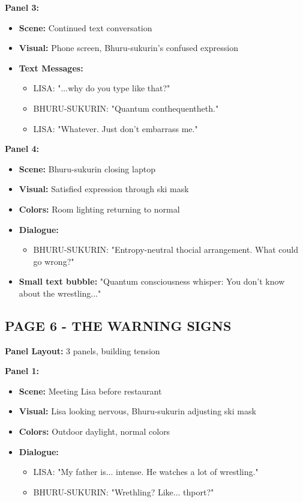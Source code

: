 \documentclass[12pt,a4paper]{article}
\begin{document}
\textbf{Panel 3:}
\begin{itemize}
\item \textbf{Scene:} Continued text conversation
\item \textbf{Visual:} Phone screen, Bhuru-sukurin's confused expression
\item \textbf{Text Messages:}
\begin{itemize}
\item LISA: "...why do you type like that?"
\item BHURU-SUKURIN: "Quantum conthequentheth."
\item LISA: "Whatever. Just don't embarrass me."
\end{itemize}
\end{itemize}

\textbf{Panel 4:}
\begin{itemize}
\item \textbf{Scene:} Bhuru-sukurin closing laptop
\item \textbf{Visual:} Satisfied expression through ski mask
\item \textbf{Colors:} Room lighting returning to normal
\item \textbf{Dialogue:}
\begin{itemize}
\item BHURU-SUKURIN: "Entropy-neutral thocial arrangement. What could go wrong?"
\end{itemize}
\item \textbf{Small text bubble:} "Quantum consciousness whisper: You don't know about the wrestling..."
\end{itemize}

\subsection{PAGE 6 - THE WARNING SIGNS}

\textbf{Panel Layout:} 3 panels, building tension

\textbf{Panel 1:}
\begin{itemize}
\item \textbf{Scene:} Meeting Lisa before restaurant
\item \textbf{Visual:} Lisa looking nervous, Bhuru-sukurin adjusting ski mask
\item \textbf{Colors:} Outdoor daylight, normal colors
\item \textbf{Dialogue:}
\begin{itemize}
\item LISA: "My father is... intense. He watches a lot of wrestling."
\item BHURU-SUKURIN: "Wrethling? Like... thport?"
\end{itemize}
\end{itemize}
\end{document}
